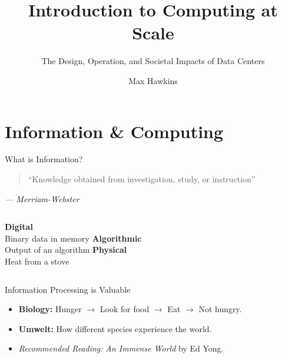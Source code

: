 \documentclass[aspectratio=169]{beamer}
\title{Introduction to Computing at Scale}
\subtitle{The Design, Operation, and Societal Impacts of Data Centers}
\author{Max Hawkins}
\date{}
\institute{Georgia Institute of Technology} %
\begin{document}
\maketitle

\section{Information \& Computing}

\begin{frame}{What is Information?}
    \centering
    \begin{quote}
        \Large ``Knowledge obtained from investigation, study, or instruction''
    \end{quote}
    \vspace{0.5em}
    \footnotesize{\textit{— Merriam-Webster}}

    \vspace{2em}
    \begin{columns}[T, onlytextwidth]
            \centering
            \textbf{Digital}\\
            Binary data in memory
            \centering
            \textbf{Algorithmic}\\
            Output of an algorithm
            \centering
            \textbf{Physical}\\
            Heat from a stove
    \end{columns}
\end{frame}

\begin{frame}{Information Processing is Valuable}

    \vspace{1.5em}
    \centering

    \vspace{1.5em}
    \begin{itemize}
        \item \textbf{Biology:} Hunger $\to$ Look for food $\to$ Eat $\to$ Not hungry.
        \item \textbf{Umwelt:} How different species experience the world.
        \item \textit{Recommended Reading:} \emph{An Immense World} by Ed Yong.
    \end{itemize}
\end{frame}
\end{document}
